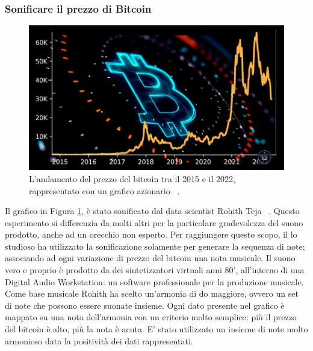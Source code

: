 \subsubsection{Sonificare il prezzo di Bitcoin}
\begin{figure}[H]
  \includegraphics[width=\linewidth]{img/btc.PNG}
  \caption{L'andamento del prezzo del bitcoin tra il 2015 e il 2022, rappresentato con un grafico azionario  ~\cite{bitcoin}.}
  \label{fig:btc}
\end{figure}
Il grafico in Figura \ref{fig:btc}, è stato sonificato dal data scientist Rohith Teja  ~\cite{bitcoin}.
Questo esperimento si differenzia da molti altri per la particolare gradevolezza del suono prodotto, anche ad un orecchio non esperto.
Per raggiungere questo scopo, il lo studioso ha utilizzato la sonificazione solamente per generare la sequenza di note; associando ad ogni variazione di prezzo del bitcoin una nota musicale.
Il suono vero e proprio è prodotto da dei sintetizzatori virtuali anni 80', all'interno di una Digital Audio Workstation: un software professionale per la produzione musicale.
Come base musicale Rohith ha scelto un'armonia di do maggiore, ovvero un set di note che possono essere suonate insieme.
Ogni dato presente nel grafico è mappato su una nota dell'armonia con un criterio molto semplice: più il prezzo del bitcoin è alto, più la nota è acuta.
E' stato utilizzato un insieme di note molto armonioso data la positività dei dati rappresentati.
\\\\


